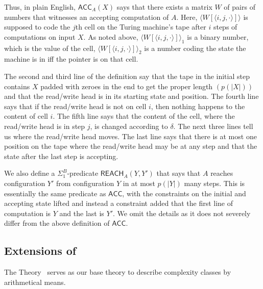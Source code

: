\documentclass{LMCS}
\newcommand{\abs}[1]{\left\vert#1\right\vert}
\begin{document}
\noindent Thus, in plain English, $\mathsf{ACC}_A(X)$ says that there exists a matrix $W$ of pairs of numbers that
witnesses an accepting computation of $A$. Here, $\langle W[\langle i,j,\cdot \rangle]\rangle$ is supposed to
code the $j$th cell on the Turing machine's tape after $i$ steps of computations on input $X$. As noted above,
$\langle W[\langle i,j,\cdot \rangle]\rangle_1$ is a binary number, which is the value of the cell, $\langle
W[\langle i,j,\cdot \rangle]\rangle_2$ is a number coding the state the machine is in iff the pointer is on that
cell.

The second and third line of the definition say that the tape in the initial step contains $X$ padded with
zeroes in the end to get the proper length $(p(\abs{X}))$ and that the read/write head is in its starting state
and position. The fourth line says that if the read/write head is not on cell $i$, then nothing happens to the
content of cell $i$. The fifth line says that the content of the cell, where the read/write head is in step $j$,
is changed according to $\delta$. The next three lines tell us where the read/write head moves. The last line
says that there is at most one position on the tape where the read/write head may be at any step and that the
state after the last step is accepting.

We also define a $\Sigma^B_1$-predicate $\mathsf{REACH}_A(Y,Y')$ that says that $A$ reaches configuration $Y'$
from configuration $Y$ in at most $p(\abs{Y})$ many steps. This is essentially the same predicate as
$\mathsf{ACC}$, with the constraints on the initial and accepting state lifted and instead a constraint added
that the first line of computation is $Y$ and the last is $Y'$. We omit the details as it does not severely
differ from the above definition of $\mathsf{ACC}$.




\subsection{Extensions of \VZ}\label{Sec:Ext of VZ}

The Theory \VZ\ serves as our base theory to describe complexity classes by arithmetical means.
\end{document}
